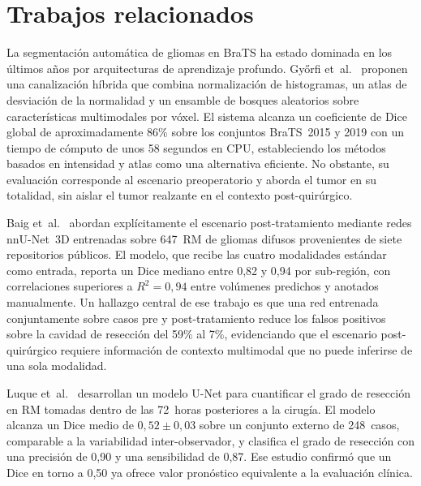 \documentclass[conference]{IEEEtran}
\begin{document}
\section{Trabajos relacionados}

La segmentaci\'{o}n autom\'{a}tica de gliomas en BraTS ha estado
dominada en los \'{u}ltimos a\~{n}os por arquitecturas de aprendizaje
profundo.
Gy\H{o}rfi et~al.~\cite{gyorfi2021ensemble} proponen una
canalizaci\'{o}n h\'{i}brida que combina normalizaci\'{o}n de
histogramas, un atlas de desviaci\'{o}n de la normalidad y un
ensamble de bosques aleatorios sobre caracter\'{i}sticas
multimodales por v\'{o}xel.
El sistema alcanza un coeficiente de Dice global de aproximadamente
86\% sobre los conjuntos BraTS~2015 y 2019 con un tiempo de
c\'{o}mputo de unos 58 segundos en CPU, estableciendo los
m\'{e}todos basados en intensidad y atlas como una alternativa
eficiente.
No obstante, su evaluaci\'{o}n corresponde al escenario preoperatorio
y aborda el tumor en su totalidad, sin aislar el tumor realzante
en el contexto post-quir\'{u}rgico.

Baig et~al.~\cite{baig2024nnunet} abordan expl\'{i}citamente el
escenario post-tratamiento mediante redes nnU-Net~3D entrenadas
sobre 647~RM de gliomas difusos provenientes de siete repositorios
p\'{u}blicos.
El modelo, que recibe las cuatro modalidades est\'{a}ndar como
entrada, reporta un Dice mediano entre 0,82 y 0,94 por
sub-regi\'{o}n, con correlaciones superiores a $R^2 = 0{,}94$ entre
vol\'{u}menes predichos y anotados manualmente.
Un hallazgo central de ese trabajo es que una red entrenada
conjuntamente sobre casos pre y post-tratamiento reduce los falsos
positivos sobre la cavidad de resecci\'{o}n del 59\% al 7\%,
evidenciando que el escenario post-quir\'{u}rgico requiere
informaci\'{o}n de contexto multimodal que no puede inferirse de una
sola modalidad.

Luque et~al.~\cite{luque2024extension} desarrollan un modelo
U-Net para cuantificar el grado de resecci\'{o}n en RM tomadas
dentro de las 72~horas posteriores a la cirug\'{i}a.
El modelo alcanza un Dice medio de $0{,}52 \pm 0{,}03$ sobre un
conjunto externo de 248~casos, comparable a la variabilidad
inter-observador, y clasifica el grado de resecci\'{o}n con una
precisi\'{o}n de 0,90 y una sensibilidad de 0,87.
Ese estudio confirm\'{o} que un Dice en torno a 0,50 ya ofrece valor
pron\'{o}stico equivalente a la evaluaci\'{o}n cl\'{i}nica.
\end{document}
